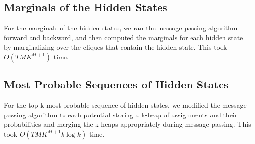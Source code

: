 \subsection{Marginals of the Hidden States}

For the marginals of the hidden states, we ran the message passing algorithm forward and backward, and then computed the marginals for each hidden state by marginalizing over the cliques that contain the hidden state. This took $O(TMK^{M+1})$ time.

\subsection{Most Probable Sequences of Hidden States}

For the top-k most probable sequence of hidden states, we modified the message passing algorithm to each potential storing a k-heap of assignments and their probabilities and merging the k-heaps appropriately during message passing. This took $O(TMK^{M+1} k\log k)$ time.

